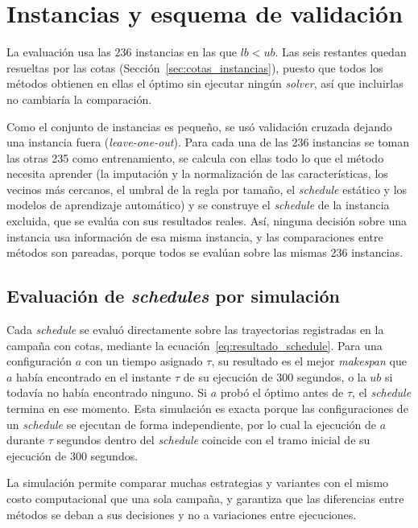 \section{Instancias y esquema de validación}
\label{sec:validacion}

La evaluación usa las 236 instancias en las que $lb < ub$. Las seis restantes
quedan resueltas por las cotas (Sección~\ref{sec:cotas_instancias}), puesto que
todos los métodos obtienen en ellas el óptimo sin ejecutar ningún
\textit{solver}, así que incluirlas no cambiaría la comparación.

Como el conjunto de instancias es pequeño, se usó validación cruzada dejando
una instancia fuera (\textit{leave-one-out}). Para cada una de las 236
instancias se toman las otras 235 como entrenamiento, se calcula con ellas
todo lo que el método necesita aprender (la imputación y la normalización de
las características, los vecinos más cercanos, el umbral de la regla por
tamaño, el \textit{schedule} estático y los modelos de aprendizaje automático)
y se construye el \textit{schedule} de la instancia excluida, que se evalúa con
sus resultados reales. Así, ninguna decisión sobre una instancia usa
información de esa misma instancia, y las comparaciones entre métodos son
pareadas, porque todos se evalúan sobre las mismas 236 instancias.

\subsection{Evaluación de \textit{schedules} por simulación}

Cada \textit{schedule} se evaluó directamente sobre las trayectorias
registradas en la campaña con cotas, mediante la
ecuación~\eqref{eq:resultado_schedule}. Para una configuración $a$ con un
tiempo asignado $\tau$, su resultado es el mejor \textit{makespan} que $a$
había encontrado en el instante $\tau$ de su ejecución de 300 segundos, o la
$ub$ si todavía no había encontrado ninguno. Si $a$ probó el óptimo antes de
$\tau$, el \textit{schedule} termina en ese momento. Esta simulación es exacta
porque las configuraciones de un \textit{schedule} se ejecutan de forma
independiente, por lo cual la ejecución de $a$ durante $\tau$ segundos dentro
del \textit{schedule} coincide con el tramo inicial de su ejecución de 300
segundos.

La simulación permite comparar muchas estrategias y variantes con el mismo
costo computacional que una sola campaña, y garantiza que las diferencias
entre métodos se deban a sus decisiones y no a variaciones entre ejecuciones.

